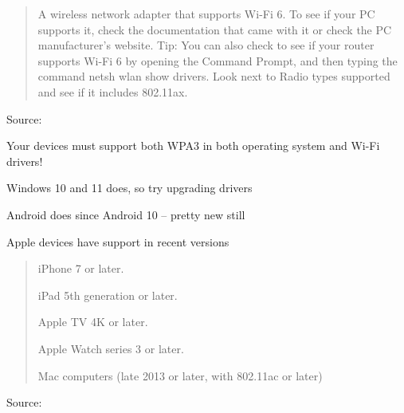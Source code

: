 \documentclass[Screen16to9,17pt]{foils}
\begin{document}
\begin{quote}
A wireless network adapter that supports Wi-Fi 6. To see if your PC supports it, check the documentation that came with it or check the PC manufacturer’s website.
Tip: You can also check to see if your router supports Wi-Fi 6 by opening the Command Prompt, and then typing the command netsh wlan show drivers. Look next to Radio types supported and see if it includes 802.11ax.
\end{quote}
Source: 

\begin{list2}
\item Your devices must support both WPA3 in both operating system and Wi-Fi drivers!
\item Windows 10 and 11 does, so try upgrading drivers
\item Android does since Android 10 -- pretty new still
\item Apple devices have support in recent versions
\end{list2}




\begin{quote}
\begin{list2}
\item iPhone 7 or later.
\item iPad 5th generation or later.
\item Apple TV 4K or later.
\item Apple Watch series 3 or later.
\item Mac computers (late 2013 or later, with 802.11ac or later)
\end{list2}
\end{quote}
Source: 



\end{document}
